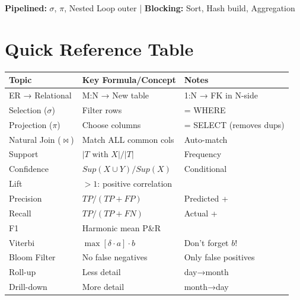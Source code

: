 \begin{center}
\textbf{Pipelined:} $\sigma$, $\pi$, Nested Loop outer \quad | \quad \textbf{Blocking:} Sort, Hash build, Aggregation
\end{center}

\section{Quick Reference Table}

\begin{center}
\begin{tabular}{lll}
\toprule
\textbf{Topic} & \textbf{Key Formula/Concept} & \textbf{Notes} \\
\midrule
ER → Relational & M:N → New table & 1:N → FK in N-side \\
Selection ($\sigma$) & Filter rows & = WHERE \\
Projection ($\pi$) & Choose columns & = SELECT (removes dups) \\
Natural Join ($\bowtie$) & Match ALL common cols & Auto-match \\
\midrule
Support & $|T \text{ with } X| / |T|$ & Frequency \\
Confidence & $Sup(X \cup Y) / Sup(X)$ & Conditional \\
Lift & $>1$: positive correlation & \\
\midrule
Precision & $TP/(TP+FP)$ & Predicted + \\
Recall & $TP/(TP+FN)$ & Actual + \\
F1 & Harmonic mean P\&R & \\
\midrule
Viterbi & $\max[\delta \cdot a] \cdot b$ & Don't forget $b$! \\
Bloom Filter & No false negatives & Only false positives \\
\midrule
Roll-up & Less detail & day→month \\
Drill-down & More detail & month→day \\
\bottomrule
\end{tabular}
\end{center}

